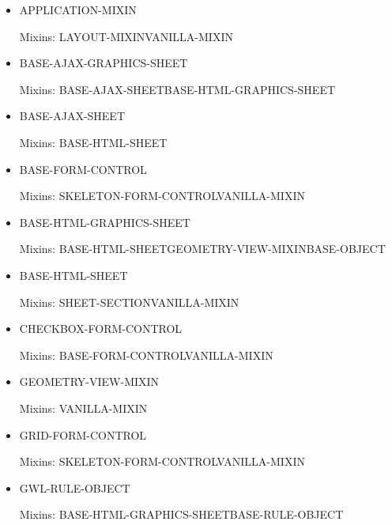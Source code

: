 \documentclass [11pt]{book}
\begin{document}
\begin{itemize}

\item {}APPLICATION-MIXIN

Mixins: LAYOUT-MIXINVANILLA-MIXIN



\item {}BASE-AJAX-GRAPHICS-SHEET

Mixins: BASE-AJAX-SHEETBASE-HTML-GRAPHICS-SHEET



\item {}BASE-AJAX-SHEET

Mixins: BASE-HTML-SHEET



\item {}BASE-FORM-CONTROL

Mixins: SKELETON-FORM-CONTROLVANILLA-MIXIN



\item {}BASE-HTML-GRAPHICS-SHEET

Mixins: BASE-HTML-SHEETGEOMETRY-VIEW-MIXINBASE-OBJECT



\item {}BASE-HTML-SHEET

Mixins: SHEET-SECTIONVANILLA-MIXIN



\item {}CHECKBOX-FORM-CONTROL

Mixins: BASE-FORM-CONTROLVANILLA-MIXIN



\item {}GEOMETRY-VIEW-MIXIN

Mixins: VANILLA-MIXIN



\item {}GRID-FORM-CONTROL

Mixins: SKELETON-FORM-CONTROLVANILLA-MIXIN



\item {}GWL-RULE-OBJECT

Mixins: BASE-HTML-GRAPHICS-SHEETBASE-RULE-OBJECT




\end{itemize}
\end{document}
